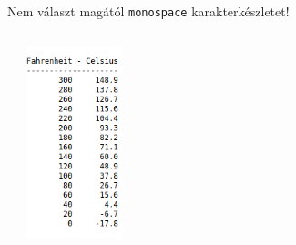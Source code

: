 \begin{frame}
  Nem választ magától \texttt{monospace} karakterkészletet!
  \begin{columns}[c]
      \begin{exampleblock}{}
        \footnotesize
        
        
      \end{exampleblock}
      \includegraphics[width=0.7\textwidth]{fahrcels2.png}
  \end{columns}
\end{frame}

